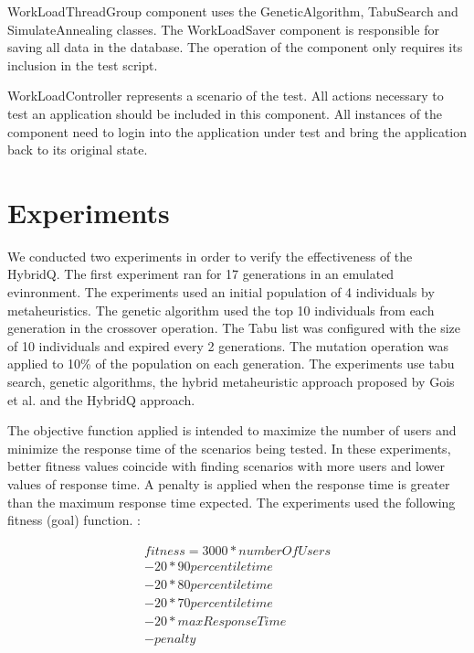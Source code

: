 \documentclass{bmcart}
\begin{document}
WorkLoadThreadGroup component uses the GeneticAlgorithm, TabuSearch and SimulateAnnealing classes.  The WorkLoadSaver component is responsible for saving all data in the database. The operation of the component only requires its inclusion in the test script.

WorkLoadController represents a scenario of the test. All actions necessary to test an application should be included in this component. All instances of the component need to login into the application under test and bring the application back to its original state.



\section{Experiments}

We conducted two experiments in order to verify the effectiveness of the HybridQ. The first experiment ran for 17 generations in an emulated evinronment. The experiments used an initial population of 4 individuals by metaheuristics. The genetic algorithm used the top 10 individuals from each generation in the crossover operation. The Tabu list was configured with the size of 10 individuals and expired every 2 generations.  The mutation operation was applied to 10\% of the population on each generation. The experiments use tabu search, genetic algorithms, the hybrid metaheuristic approach proposed by Gois et al. \citep{Gois2016} and the HybridQ approach. 


The objective function applied is intended to maximize the number of users and minimize the response time of the scenarios being tested.  In these experiments, better fitness values coincide with finding scenarios with more users and lower values of response time. A penalty is applied when the response time is greater than the  maximum response time expected. The experiments used the following fitness (goal) function. :

\begin{equation}
\begin{aligned}
fitness=3000*numberOfUsers\\
-20* 90percentiletime\\
-20*80percentiletime\\
-20*70percentiletime\\
-20*maxResponseTime\\
-penalty
\end{aligned}
\end{equation}
\end{document}
